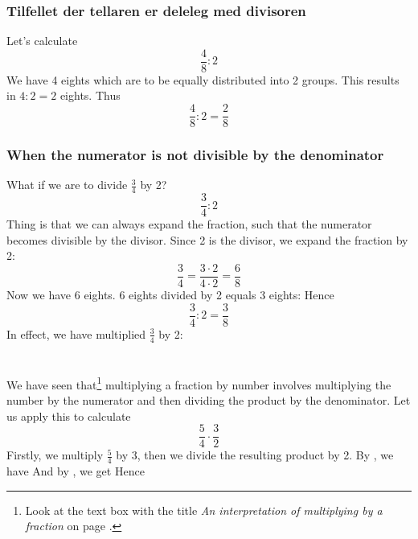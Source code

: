 \subsubsection{Tilfellet der tellaren er deleleg med divisoren}
Let's calculate
\[ \frac{4}{8}:2 \]
We have 4 eights which are to be equally distributed into 2 groups. This results in $ 4:2=2 $ eights.
Thus
\[ \frac{4}{8}:2=\frac{2}{8} \]
\newpage
\subsubsection{When the numerator is not divisible by the denominator}
What if we are to divide $ \frac{3}{4} $ by 2? 
\[ \frac{3}{4}:2 \]
Thing is that we can always expand the fraction, such that the numerator becomes divisible by the divisor. Since 2 is the divisor, we expand the fraction by 2:
\[ \frac{3}{4}=\frac{3\cdot2}{4\cdot2}=\frac{6}{8} \]
Now we have 6 eights. 6 eights divided by 2 equals 3 eights:
Hence
\[ \frac{3}{4}:2=\frac{3}{8} \]
In effect, we have multiplied $ \frac{3}{4} $ by 2:
\section{\brgngbr \label{brgngbr}}		
We have seen that\footnote{Look at the text box with the title \textit{An interpretation of multiplying by a fraction} on page \pageref{brtolk}.} multiplying a fraction by number involves multiplying the number by the numerator and then dividing the product by the denominator. Let us apply this to calculate
\[  {\frac{5}{4}\cdot\frac{3}{2}}\] 
Firstly, we multiply $ \frac{5}{4} $ by 3, then we divide the resulting product by 2. By , we have
And by , we get
Hence
\reg[\brtbr\label{brtbr}]{
When multiplying a fraction by a fraction, we multiply numerator by numerator and denominator by denominator.
}
\newpage
